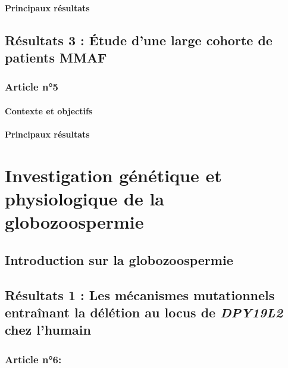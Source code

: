 \documentclass[12pt,twoside]{ugathesis}
\begin{document}
\subsubsection{Principaux résultats}\label{principaux-resultats-3}

\section{Résultats 3 : Étude d'une large cohorte de patients
MMAF}\label{resultats-3-etude-dune-large-cohorte-de-patients-mmaf}

\subsection{Article n°5}\label{article-n5}

\subsubsection{Contexte et objectifs}\label{contexte-et-objectifs-4}

\subsubsection{Principaux résultats}\label{principaux-resultats-4}

\chapter{Investigation génétique et physiologique de la
globozoospermie}\label{globo}

\section{Introduction sur la
globozoospermie}\label{introduction-sur-la-globozoospermie}

\section{\texorpdfstring{Résultats 1 : Les mécanismes mutationnels
entraînant la délétion au locus de \emph{DPY19L2} chez
l'humain}{Résultats 1 : Les mécanismes mutationnels entraînant la délétion au locus de DPY19L2 chez l'humain}}\label{mecamut}

\subsection{Article n°6:}\label{article-n6}
\end{document}
